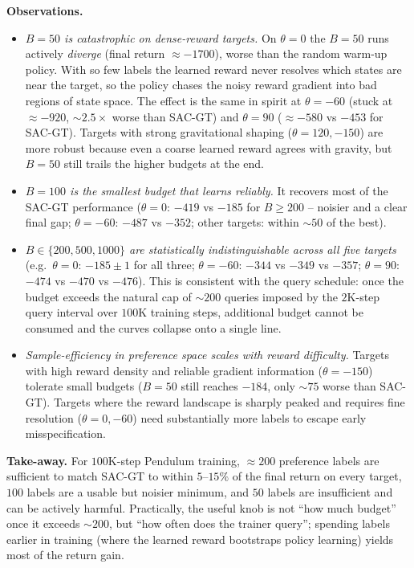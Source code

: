 \documentclass[12pt]{scrartcl}
\begin{document}
\begin{enumerate}
    \textbf{Observations.}
    \begin{itemize}
        \item \emph{$B=50$ is catastrophic on dense-reward targets.} On $\theta=0$ the $B=50$ runs actively \emph{diverge} (final return $\approx -1700$), worse than the random warm-up policy. With so few labels the learned reward never resolves which states are near the target, so the policy chases the noisy reward gradient into bad regions of state space. The effect is the same in spirit at $\theta=-60$ (stuck at $\approx -920$, $\sim 2.5\times$ worse than SAC-GT) and $\theta=90$ ($\approx -580$ vs $-453$ for SAC-GT). Targets with strong gravitational shaping ($\theta=120,-150$) are more robust because even a coarse learned reward agrees with gravity, but $B=50$ still trails the higher budgets at the end.
        \item \emph{$B=100$ is the smallest budget that learns reliably.} It recovers most of the SAC-GT performance ($\theta=0$: $-419$ vs $-185$ for $B\geq 200$ -- noisier and a clear final gap; $\theta=-60$: $-487$ vs $-352$; other targets: within $\sim 50$ of the best).
        \item \emph{$B\in\{200,500,1000\}$ are statistically indistinguishable across all five targets} (e.g.\ $\theta=0$: $-185\pm 1$ for all three; $\theta=-60$: $-344$ vs $-349$ vs $-357$; $\theta=90$: $-474$ vs $-470$ vs $-476$). This is consistent with the query schedule: once the budget exceeds the natural cap of $\sim 200$ queries imposed by the $2$K-step query interval over $100$K training steps, additional budget cannot be consumed and the curves collapse onto a single line.
        \item \emph{Sample-efficiency in preference space scales with reward difficulty.} Targets with high reward density and reliable gradient information ($\theta=-150$) tolerate small budgets ($B=50$ still reaches $-184$, only $\sim 75$ worse than SAC-GT). Targets where the reward landscape is sharply peaked and requires fine resolution ($\theta=0,-60$) need substantially more labels to escape early misspecification.
    \end{itemize}

    \textbf{Take-away.} For $100$K-step Pendulum training, $\approx 200$ preference labels are sufficient to match SAC-GT to within $5$--$15\%$ of the final return on every target, $100$ labels are a usable but noisier minimum, and $50$ labels are insufficient and can be actively harmful. Practically, the useful knob is not ``how much budget'' once it exceeds $\sim 200$, but ``how often does the trainer query''; spending labels earlier in training (where the learned reward bootstraps policy learning) yields most of the return gain.
\end{enumerate}
\end{document}
